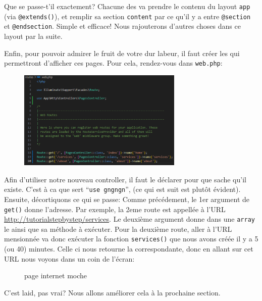 Que se passe-t'il exactement? Chacune des \views{} va prendre le contenu du layout \verb|app| (via \verb|@extends()|), et remplir sa section \verb|content| par ce qu'il y a entre \verb|@section| et \verb|@endsection|. Simple et efficace! Nous rajouterons d'autres choses dans ce layout par la suite.

\newpage

Enfin, pour pouvoir admirer le fruit de votre dur labeur, il faut créer les \routes{} qui permettront d'afficher ces pages. Pour cela, rendez-vous dans \verb|web.php|:

\begin{figure}
    \vspace{-0.5cm}
    \includegraphics[width=0.7\textwidth]{figures-C1/3_premieres_routes.pdf}
    \caption{}
\end{figure}
Afin d'utiliser notre nouveau controller, il faut le déclarer pour que \laravel{} sache qu'il existe. C'est à ca que sert ``\verb|use gngngn|'', (ce qui est suit est plutôt évident).
Ensuite, décortiquons ce qui se passe: Comme précédement, le 1er argument de \verb|get()| donne l'adresse. Par exemple, la 2eme route est appellée à l'URL \url{http://tutorialstepbystep/services}. Le deuxième argument donne dans une \texttt{array} le \controller{} ainsi que sa méthode à exécuter. Pour la deuxième route, aller à l'URL mensionnée va donc exécuter la fonction \verb|services()| que nous avons créée il y a 5 (ou 40) minutes. Celle ci nous retourne la \view{} correspondante, donc en allant sur cet URL nous voyons dans un coin de l'écran:

\begin{figure}[!h]
    \centering
    \caption{page internet moche}
\end{figure}

C'est laid, pas vrai? Nous allons améliorer cela à la prochaine section.

\newpage
